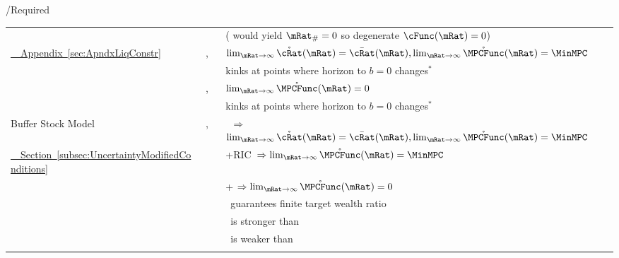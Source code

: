 \documentclass[\econtexRoot/BufferStockTeory]{subfiles}
\begin{document}
\begin{verbatimwrite}{\TableDir/Required}
\begin{table}
{\begin{tabular}{|l|l|l|}
\\ & & (\cncl{\RIC} would yield $\mRat_{\#}=0$ so degenerate $\cFunc(\mRat)=0$)
  \\ \cline{2-3} \href{https://\owner.github.io/BufferStockTheory\#ApndxLiqConstr}{~~Appendix~\ref{sec:ApndxLiqConstr}} & \PFGIC,\RIC & $\lim_{\mRat \rightarrow \infty} \mathring{\cRat}(\mRat)=\bar{\cRat}(\mRat), \lim_{\mRat \rightarrow \infty} \mathring{\MPCFunc}(\mRat)=\MinMPC$ 
\\                                          &                                 & kinks at points where horizon to $b=0$ changes$^{\ast}$
  \\ \cline{2-3}                              &   \PFGIC,\cncl{\RIC}    & $\lim_{\mRat \rightarrow \infty} \mathring{\MPCFunc}(\mRat)=0$
\\                                          &                                 & kinks at points where horizon to $b=0$ changes$^{\ast}$
\\ \hline\hline \multicolumn{1}{|l|}{Buffer Stock Model} & \FVAC, \WRIC~                     & \FHWC~$\Rightarrow$ $\lim_{\mRat \rightarrow \infty} \mathring{\cRat}(\mRat)=\bar{\cRat}(\mRat), \lim_{\mRat \rightarrow \infty} \mathring{\MPCFunc}(\mRat)=\MinMPC$
  \\ \href{https://\owner.github.io/BufferStockTheory\#Uncertainty-Modified-Conditions}{~~Section~\ref{subsec:UncertaintyModifiedConditions}}
                                            &                                 & \cncl{\FHWC}+RIC~$\Rightarrow \lim_{\mRat \rightarrow \infty} \mathring{\MPCFunc}(\mRat)=\MinMPC$
\\                                          &                                 & \cncl{\FHWC}+\cncl{\RIC} $\Rightarrow \lim_{\mRat \rightarrow \infty} \mathring{\MPCFunc}(\mRat)=0$
\\                                          &                                 & \GIC~guarantees finite target wealth ratio
\\                                          &                                 & \FVAC~is stronger than \PFFVAC~
\\                                          &                                 & \WRIC~is weaker than \RIC~
\\ \hline \multicolumn{3}{c}{}
\end{tabular}
} %


\end{table}
\end{verbatimwrite}
\end{document}
